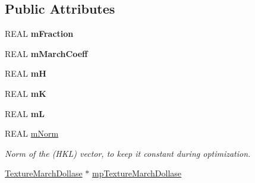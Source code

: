 \subsection*{Public Attributes}
\begin{DoxyCompactItemize}
\item 
\mbox{\label{struct_obj_cryst_1_1_texture_phase_march_dollase_a9059c8d95baeb8bba194188167fd6ba3}} 
R\+E\+AL {\bfseries m\+Fraction}
\item 
\mbox{\label{struct_obj_cryst_1_1_texture_phase_march_dollase_af54a682c4bea01ad89bf09c234e25f92}} 
R\+E\+AL {\bfseries m\+March\+Coeff}
\item 
\mbox{\label{struct_obj_cryst_1_1_texture_phase_march_dollase_ad22aba0c945d8bbcb3238f1059410b5a}} 
R\+E\+AL {\bfseries mH}
\item 
\mbox{\label{struct_obj_cryst_1_1_texture_phase_march_dollase_ad06c88aedc5968653bc895601c6d5754}} 
R\+E\+AL {\bfseries mK}
\item 
\mbox{\label{struct_obj_cryst_1_1_texture_phase_march_dollase_ae20d183c75da02534d4ef887166ed99d}} 
R\+E\+AL {\bfseries mL}
\item 
\mbox{\label{struct_obj_cryst_1_1_texture_phase_march_dollase_a3affb0c886c88243f76a7d38f30e10f3}} 
R\+E\+AL \mbox{\hyperlink{struct_obj_cryst_1_1_texture_phase_march_dollase_a3affb0c886c88243f76a7d38f30e10f3}{m\+Norm}}
\begin{DoxyCompactList}\small\item\em Norm of the (H\+KL) vector, to keep it constant during optimization. \end{DoxyCompactList}\item 
\mbox{\label{struct_obj_cryst_1_1_texture_phase_march_dollase_acf640da43b88a1955cd490fb64f1d1c6}} 
\mbox{\hyperlink{class_obj_cryst_1_1_texture_march_dollase}{Texture\+March\+Dollase}} $\ast$ \mbox{\hyperlink{struct_obj_cryst_1_1_texture_phase_march_dollase_acf640da43b88a1955cd490fb64f1d1c6}{mp\+Texture\+March\+Dollase}}

\end{DoxyCompactItemize}

